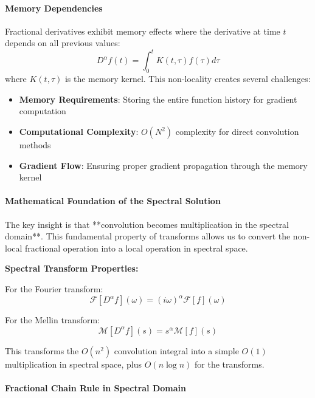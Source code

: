 \paragraph{Memory Dependencies}

Fractional derivatives exhibit memory effects where the derivative at time $t$ depends on all previous values:
\begin{equation}
D^{\alpha} f(t) = \int_0^t K(t,\tau) f(\tau) d\tau
\end{equation}
where $K(t,\tau)$ is the memory kernel. This non-locality creates several challenges:
\begin{itemize}
\item \textbf{Memory Requirements}: Storing the entire function history for gradient computation
\item \textbf{Computational Complexity}: $O(N^2)$ complexity for direct convolution methods
\item \textbf{Gradient Flow}: Ensuring proper gradient propagation through the memory kernel
\end{itemize}

\paragraph{Mathematical Foundation of the Spectral Solution}

The key insight is that **convolution becomes multiplication in the spectral domain**. This fundamental property of transforms allows us to convert the non-local fractional operation into a local operation in spectral space.

\textbf{Spectral Transform Properties:}

For the Fourier transform:
\begin{equation}
\mathcal{F}[D^{\alpha}f](\omega) = (i\omega)^{\alpha} \mathcal{F}[f](\omega)
\end{equation}

For the Mellin transform:
\begin{equation}
\mathcal{M}[D^{\alpha}f](s) = s^{\alpha} \mathcal{M}[f](s)
\end{equation}

This transforms the $O(n^2)$ convolution integral into a simple $O(1)$ multiplication in spectral space, plus $O(n \log n)$ for the transforms.

\paragraph{Fractional Chain Rule in Spectral Domain}

